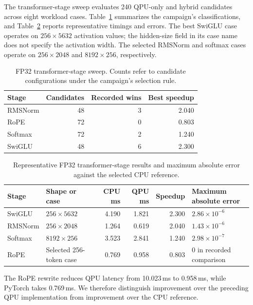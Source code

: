 \documentclass[sigplan,screen,review]{acmart}
\begin{document}
The transformer-stage sweep evaluates 240 QPU-only and hybrid candidates across eight workload cases. Table~\ref{tab:stage-counts} summarizes the campaign's classifications, and Table~\ref{tab:stage-errors} reports representative timings and errors. The best SwiGLU case operates on \(256\times5632\) activation values; the hidden-size field in its case name does not specify the activation width. The selected RMSNorm and softmax cases operate on \(256\times2048\) and \(8192\times256\), respectively.

\begin{table}[t]
\centering
\caption{FP32 transformer-stage sweep. Counts refer to candidate configurations under the campaign's selection rule.}
\label{tab:stage-counts}
\small
\begin{tabular}{@{}lrrr@{}}
\toprule
Stage & Candidates & Recorded wins & Best speedup \\
\midrule
RMSNorm & 48 & 3 & 2.040 \\
RoPE & 72 & 0 & 0.803 \\
Softmax & 72 & 2 & 1.240 \\
SwiGLU & 48 & 6 & 2.300 \\
\bottomrule
\end{tabular}
\end{table}

\begin{table}[t]
\centering
\caption{Representative FP32 transformer-stage results and maximum absolute error against the selected CPU reference.}
\label{tab:stage-errors}
\small
\begin{tabular}{@{}llrrrl@{}}
\toprule
Stage & Shape or case & CPU ms & QPU ms & Speedup & Maximum absolute error \\
\midrule
SwiGLU & $256\times5632$ & 4.190 & 1.821 & 2.300 & $2.86\times10^{-6}$ \\
RMSNorm & $256\times2048$ & 1.264 & 0.619 & 2.040 & $1.43\times10^{-6}$ \\
Softmax & $8192\times256$ & 3.523 & 2.841 & 1.240 & $2.98\times10^{-7}$ \\
RoPE & Selected 256-token case & 0.769 & 0.958 & 0.803 & 0 in recorded comparison \\
\bottomrule
\end{tabular}
\end{table}

The RoPE rewrite reduces QPU latency from 10.023\,ms to 0.958\,ms, while PyTorch takes 0.769\,ms. We therefore distinguish improvement over the preceding QPU implementation from improvement over the CPU reference.
\end{document}

